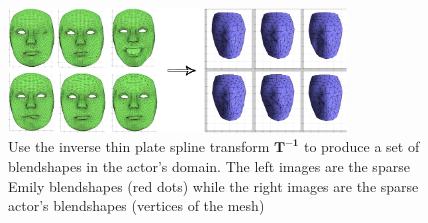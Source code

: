 \begin{figure}[htbp!]
        \centering
        \includegraphics[width=0.8\textwidth]{img/EtoRblends}
        \caption{Use the inverse thin plate spline transform $\mathbf{T^{-1}}$ to produce a set of blendshapes in the actor's domain. The left images are the sparse Emily blendshapes (red dots) while the right images are the sparse actor's blendshapes (vertices of the mesh)}\label{fig:EtoR}
\end{figure}

